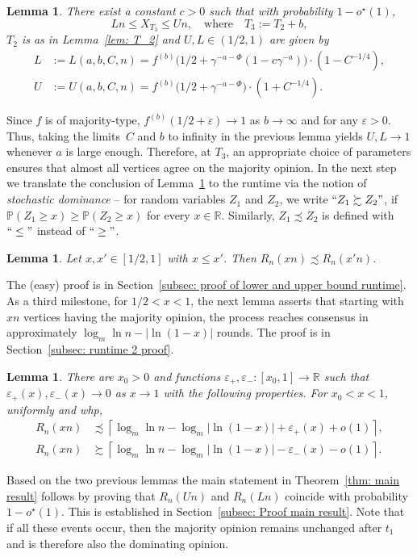 \documentclass[11pt]{article}
\newcommand{\Prob}{\mathbb{P}}
\numberwithin{theorem}{section}
\newtheorem{lemma}[theorem]{Lemma}
\begin{document}
\begin{lemma}\label{lem: T_2 consequence}
    There exist a constant $c>0$ such that with probability $1-o^\star(1)$,
\[
    L n\leq X_{T_3} \leq Un,
    \quad \text{where}\quad
    T_3 := T_2 + b,
\]
$T_2$ is as in Lemma~\ref{lem: T_2} and $U,L\in (1/2,1)$ are given by
\begin{equation}
\label{eq:lu}
\begin{aligned}
    L &:=L(a,b,C,n)
        = f^{(b)}\big(1/2+\gamma^{-a-\Phi}(1-c\gamma^{-a})\big) \cdot (1-C^{-1/4}), \\
    U&:=U(a,b,C,n)
        = f^{(b)}\big(1/2+\gamma^{-a-\Phi}\big)\cdot(1+C^{-1/4}).
\end{aligned}
\end{equation} 
\end{lemma}  
Since $f$ is of majority-type, $f^{(b)}(1/2+\varepsilon)\to 1$ as $b\to \infty$ and for any $\varepsilon>0$.
Thus, taking the limits~$C$ and $b$ to infinity in the previous lemma yields $U,L \to 1$ whenever $a$ is large enough.
Therefore, at $T_3$, an appropriate choice of parameters ensures that almost all vertices agree on the majority opinion.
In the next step we translate the conclusion of Lemma~\ref{lem: T_2 consequence}
to the runtime via the notion of \emph{stochastic dominance} --
for random variables $Z_1$ and $Z_2$, we write $``Z_1\succsim Z_2"$, if $\Prob(Z_1\geq x)\geq \Prob(Z_2 \geq x)$ for every $x\in \mathbb{R}$. Similarly, $Z_1\precsim Z_2$ is defined with $``\leq"$ instead of $``\geq"$. 
\begin{lemma}\label{lem: lower and upper bound runtime}
Let $x,x'\in[1/2,1]$ with $x\leq x'$. Then $R_n(x n) \precsim R_n(x'n)$.
\end{lemma}
The (easy) proof is in Section~\ref{subsec: proof of lower and upper bound runtime}. 
As a third milestone, for $1/2<x<1$, the next lemma asserts that starting with $x n$ vertices having the majority opinion, the process reaches consensus in approximately $\log_m\ln n-|\ln (1-x)|$ rounds. The proof is in Section~\ref{subsec: runtime 2 proof}.
\begin{lemma}
\label{lem: lower and upper bound runtime 2} 
    There are $x_0 > 0$ and functions $\varepsilon_+,\varepsilon_-:[x_0,1] \to \mathbb{R}$ such that $\varepsilon_+(x), \varepsilon_-(x) \to 0$ as $x \to 1$ with the following properties. For  $x_0 < x < 1$, uniformly and whp,
    \begin{align*}
        R_n(xn) &\precsim \left\lceil \log_m\ln n-\log_m|\ln (1-x)|+\varepsilon_+(x)+o(1) \right\rceil, \\
        R_n(x n) &\succsim \left\lceil \log_m\ln n-\log_m|\ln (1-x)|-\varepsilon_-(x) - o(1) \right\rceil.
    \end{align*}
\end{lemma}
Based on the two previous lemmas the main statement in Theorem~\ref{thm: main result} follows by proving that $R_n(Un)$ and $R_n(L n)$ coincide with probability $1-o^\star(1)$.
This is established in Section~\ref{subsec: Proof main result}. 
Note that if all these events occur, then the majority opinion remains unchanged after $t_1$ and is therefore also the dominating opinion.
\end{document}
